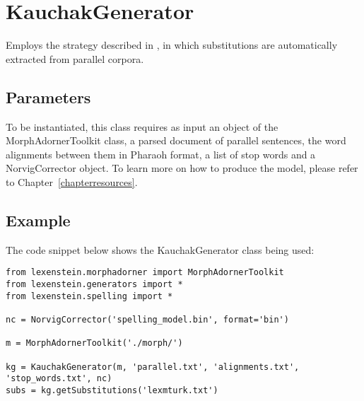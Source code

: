 \section{KauchakGenerator}

Employs the strategy described in \cite{Horn2014}, in which substitutions are automatically extracted from parallel corpora.

\subsection{Parameters}

To be instantiated, this class requires as input an object of the MorphAdornerToolkit class, a parsed document of parallel sentences, the word alignments between them in Pharaoh format, a list of stop words and a NorvigCorrector object. To learn more on how to produce the model, please refer to Chapter~\ref{chapterresources}.

\subsection{Example}

The code snippet below shows the KauchakGenerator class being used:

\begin{lstlisting}
from lexenstein.morphadorner import MorphAdornerToolkit
from lexenstein.generators import *
from lexenstein.spelling import *

nc = NorvigCorrector('spelling_model.bin', format='bin')

m = MorphAdornerToolkit('./morph/')

kg = KauchakGenerator(m, 'parallel.txt', 'alignments.txt', 'stop_words.txt', nc)
subs = kg.getSubstitutions('lexmturk.txt')
\end{lstlisting}

































